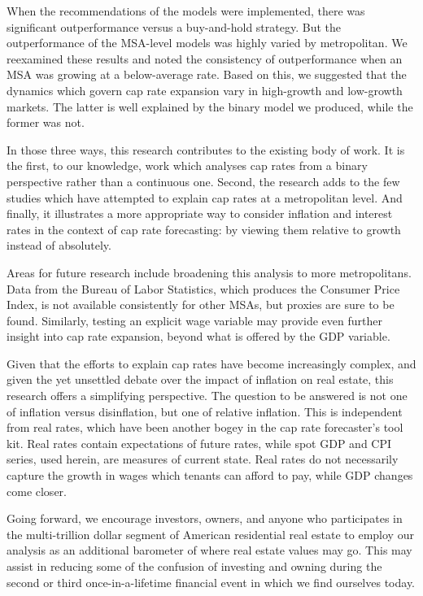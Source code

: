 When the recommendations of the models were implemented, there was significant outperformance versus a buy-and-hold strategy. But the outperformance of the MSA-level models was highly varied by metropolitan. We reexamined these results and noted the consistency of outperformance when an MSA was growing at a below-average rate. Based on this, we suggested that the dynamics which govern cap rate expansion vary in high-growth and low-growth markets. The latter is well explained by the binary model we produced, while the former was not. 

In those three ways, this research contributes to the existing body of work. It is the first, to our knowledge, work which analyses cap rates from a binary perspective rather than a continuous one. Second, the research adds to the few studies which have attempted to explain cap rates at a metropolitan level. And finally, it illustrates a more appropriate way to consider inflation and interest rates in the context of cap rate forecasting: by viewing them relative to growth instead of absolutely.

Areas for future research include broadening this analysis to more metropolitans. Data from the Bureau of Labor Statistics, which produces the Consumer Price Index, is not available consistently for other MSAs, but proxies are sure to be found. Similarly, testing an explicit wage variable may provide even further insight into cap rate expansion, beyond what is offered by the GDP variable. 

Given that the efforts to explain cap rates have become increasingly complex, and given the yet unsettled debate over the impact of inflation on real estate, this research offers a simplifying perspective. The question to be answered is not one of inflation versus disinflation, but one of relative inflation. This is independent from real rates, which have been another bogey in the cap rate forecaster's tool kit. Real rates contain expectations of future rates, while spot GDP and CPI series, used herein, are measures of current state. Real rates do not necessarily capture the growth in wages which tenants can afford to pay, while GDP changes come closer. 

Going forward, we encourage investors, owners, and anyone who participates in the multi-trillion dollar segment of American residential real estate to employ our analysis as an additional barometer of where real estate values may go. This may assist in reducing some of the confusion of investing and owning during the second or third once-in-a-lifetime financial event in which we find ourselves today.


